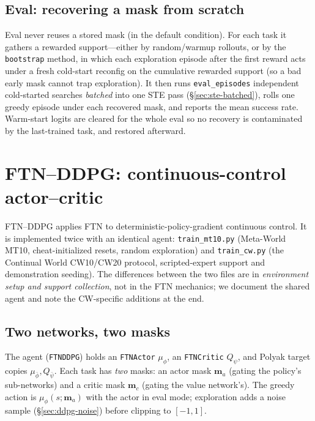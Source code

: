 \documentclass[11pt]{article}
\newcommand{\obs}{s}
\newcommand{\mask}{\bm{m}}                 %
\newcommand{\code}[1]{\texttt{\small #1}}
\begin{document}
\subsection{Eval: recovering a mask from scratch}
\label{sec:dqn-eval}

Eval never reuses a stored mask (in the default condition). For each task it
gathers a rewarded support---either by random/warmup rollouts, or by the
\code{bootstrap} method, in which each exploration episode after the first reward
acts under a fresh cold-start reconfig on the cumulative rewarded support (so a
bad early mask cannot trap exploration). It then runs \code{eval\_episodes}
independent cold-started searches \emph{batched} into one STE pass
(\S\ref{sec:ste-batched}), rolls one greedy episode under each recovered mask, and
reports the mean success rate. Warm-start logits are cleared for the whole eval so
no recovery is contaminated by the last-trained task, and restored afterward.

\section{FTN--DDPG: continuous-control actor--critic}
\label{sec:ddpg}

FTN--DDPG applies FTN to deterministic-policy-gradient continuous control. It is
implemented twice with an identical agent: \code{train\_mt10.py} (Meta-World MT10,
cheat-initialized resets, random exploration) and \code{train\_cw.py} (the
Continual World CW10/CW20 protocol, scripted-expert support and demonstration
seeding). The differences between the two files are in \emph{environment setup and
support collection}, not in the FTN mechanics; we document the shared agent and
note the CW-specific additions at the end.

\subsection{Two networks, two masks}

The agent (\code{FTNDDPG}) holds an \code{FTNActor} $\mu_\phi$, an \code{FTNCritic}
$Q_\psi$, and Polyak target copies $\mu_{\bar\phi}, Q_{\bar\psi}$. Each task has
\emph{two} masks: an actor mask $\mask_a$ (gating the policy's sub-networks) and a
critic mask $\mask_c$ (gating the value network's). The greedy action is
$\mu_\phi(\obs;\mask_a)$ with the actor in eval mode; exploration adds a noise
sample (\S\ref{sec:ddpg-noise}) before clipping to $[-1,1]$.
\end{document}

